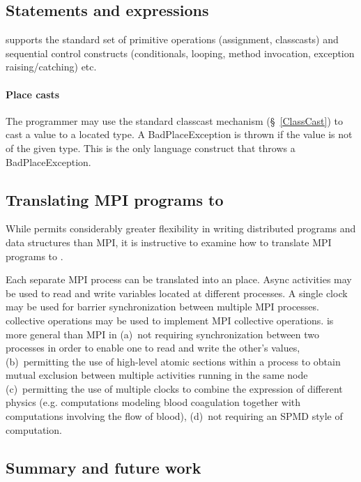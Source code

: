 \subsection{Statements and expressions}
\Xten{} supports the standard set of primitive operations (assignment, classcasts) and sequential control constructs (conditionals, looping, method
invocation, exception raising/catching) etc.

\paragraph{Place casts}
The programmer may use the standard classcast mechanism
(\S~\ref{ClassCast}) to cast a value to a located type. A {\cf
BadPlaceException} is thrown if the value is not of the given
type. This is the only language construct that throws a {\cf
BadPlaceException}.

\subsection{Translating MPI programs to \Xten{}}

While \Xten{} permits considerably greater flexibility in writing
distributed programs and data structures than MPI, it is instructive
to examine how to translate MPI programs to \Xten.

Each separate MPI process can be translated into an \Xten{}
place. Async activities may be used to read and write variables
located at different processes. A single clock may be used for barrier
synchronization between multiple MPI processes. \Xten{} collective
operations may be used to implement MPI collective operations.
\Xten{} is more general than MPI in (a)~not requiring synchronization
between two processes in order to enable one to read and write the
other's values, (b)~permitting the use of high-level atomic sections
within a process to obtain mutual exclusion between multiple
activities running in the same node (c)~permitting the use of multiple
clocks to combine the expression of different physics (e.g.{}
computations modeling blood coagulation together with computations
involving the flow of blood), (d)~not requiring an SPMD style of
computation.

\subsection{Summary and future work}

